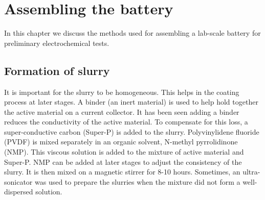 
\chapter{Assembling the battery} %
In this chapter we discuss the methods used for assembling a lab-scale battery for preliminary electrochemical tests. 
\label{chap3} %



\section{Formation of slurry}
It is important for the slurry to be homogeneous. This helps in the coating process at  later stages. A binder (an inert material) is used to help hold together the active material on a current collector. It has been seen adding a binder reduces the conductivity of the active material. To compensate for this loss, a super-conductive carbon (Super-P) is added to the slurry. Polyvinylidene fluoride (PVDF) is mixed separately in an organic solvent, N-methyl pyrrolidinone (NMP). This viscous solution is added to the mixture of active material and Super-P. NMP can be added at later stages to adjust the consistency of the slurry. It is then mixed on a magnetic stirrer for 8-10 hours. Sometimes, an ultra-sonicator was used to prepare the slurries when the mixture did not form a well-dispersed solution. 

